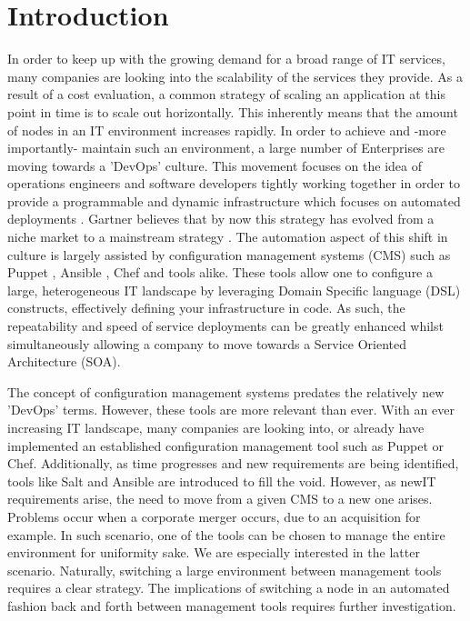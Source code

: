 \section{Introduction}\label{sec:introduction}
In order to keep up with the growing demand for a broad range of IT services, many companies are looking into the scalability of the services they provide. As a result of a cost evaluation, a common strategy of scaling an application at this point in time is to scale out horizontally. This inherently means that the amount of nodes in an IT environment increases rapidly. In order to achieve and -more importantly- maintain such an environment, a large number of Enterprises are moving towards a 'DevOps' culture. This movement focuses on the idea of operations engineers and software developers tightly working together in order to provide a programmable and dynamic infrastructure which focuses on automated deployments \cite{loukides_2012}. Gartner believes that by now this strategy has evolved from a niche market to a mainstream strategy \cite{gartner_2015}. The automation aspect of this shift in culture is largely assisted by configuration management systems (CMS) such as Puppet \cite{whatispuppet}, Ansible \cite{whatisansible}, Chef \cite{whatischef} and tools alike. These tools allow one to configure a large, heterogeneous IT landscape by leveraging Domain Specific language (DSL)  constructs, effectively defining your infrastructure in code. As such, the repeatability and speed of service deployments can be greatly enhanced whilst simultaneously allowing a company to move towards a Service Oriented Architecture (SOA).

The concept of configuration management systems predates the relatively new 'DevOps' terms. However, these tools are more relevant than ever. With an ever increasing IT landscape, many companies are looking into, or already have implemented an established configuration management tool such as Puppet or Chef. Additionally, as time progresses and new requirements are being identified, tools like Salt and Ansible are introduced to fill the void. However, as newIT requirements arise, the need to move from a given CMS to a new one arises. Problems occur when a corporate merger occurs, due to an acquisition for example. In such scenario, one of the tools can be chosen to manage the entire environment for uniformity sake. We are especially interested in the latter scenario. Naturally, switching a large environment between management tools requires a clear strategy. The implications of switching a node in an automated fashion back and forth between management tools requires further investigation. 

